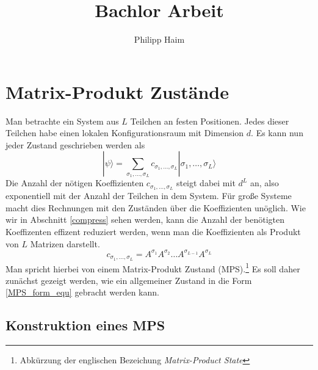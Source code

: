 \documentclass[10pt,a4paper]{report}
\author{Philipp Haim}
\title{Bachlor Arbeit}
\newcommand{\SumIndex}{\sigma_1,\ldots,\sigma_L}
\begin{document}
\maketitle
\tableofcontents

\chapter{Matrix-Produkt Zustände}\label{MPS_chapter}
Man betrachte ein System aus $L$ Teilchen an festen Positionen. Jedes dieser Teilchen habe einen lokalen Konfigurationsraum mit Dimension $d$. Es kann nun jeder Zustand geschrieben werden als 
\begin{equation}\label{psi_equ}
|\psi\rangle=\sum_{\SumIndex} c_{\SumIndex}|\SumIndex\rangle
\end{equation}
Die Anzahl der nötigen Koeffizienten $c_{\sigma_1,\ldots,\sigma_L}$ steigt dabei mit $d^L$ an, also exponentiell mit der Anzahl der Teilchen in dem System. Für große Systeme macht dies Rechnungen mit den Zuständen über die Koeffizienten unöglich. Wie wir in Abschnitt \ref{compress} sehen werden, kann die Anzahl der benötigten Koeffizenten effizent reduziert werden, wenn man die Koeffizienten als Produkt von $L$ Matrizen darstellt.\cite{MPS-main}
\begin{equation}\label{MPS_form_equ}
c_{\SumIndex}=A^{\sigma_1}A^{\sigma_2}\ldots A^{\sigma_{L-1}}A^{\sigma_L}
\end{equation}
Man spricht hierbei von einem Matrix-Produkt Zustand (MPS).\footnote{Abkürzung der englischen Bezeichung \textit{Matrix-Product State}}
Es soll daher zunächst gezeigt werden, wie ein allgemeiner Zustand in die Form \ref{MPS_form_equ} gebracht werden kann.
\section{Konstruktion eines MPS}\label{construction}
\end{document}
